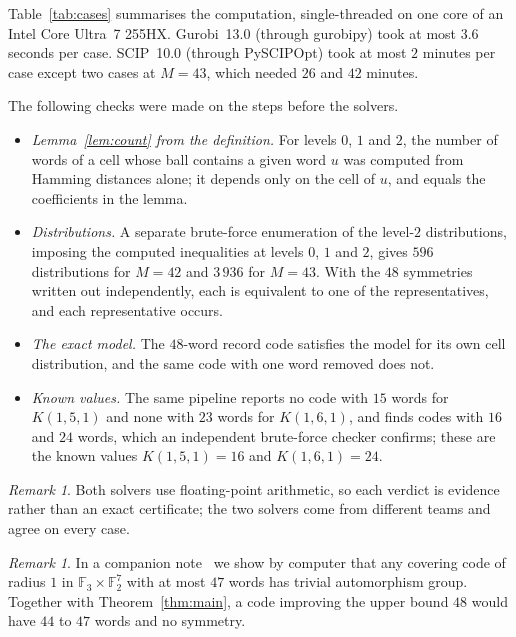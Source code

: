\documentclass[11pt]{article}
\theoremstyle{remark}
\newtheorem{remark}[theorem]{Remark}
\newcommand{\F}{\mathbb{F}}
\begin{document}
Table~\ref{tab:cases} summarises the computation, single-threaded on one core of an Intel Core
Ultra~7 255HX. Gurobi~13.0 (through gurobipy) took at most $3.6$ seconds per case. SCIP~10.0
(through PySCIPOpt) took at most $2$ minutes per case except two cases at $M=43$, which needed
$26$ and $42$ minutes.

The following checks were made on the steps before the solvers.
\begin{itemize}
\item \emph{Lemma~\ref{lem:count} from the definition.} For levels $0$, $1$ and $2$, the number
  of words of a cell whose ball contains a given word $u$ was computed from Hamming distances
  alone; it depends only on the cell of $u$, and equals the coefficients in the lemma.
\item \emph{Distributions.} A separate brute-force enumeration of the level-$2$ distributions,
  imposing the computed inequalities at levels $0$, $1$ and $2$, gives $596$ distributions for
  $M=42$ and $3\,936$ for $M=43$. With the $48$ symmetries written out independently, each is
  equivalent to one of the representatives, and each representative occurs.
\item \emph{The exact model.} The $48$-word record code satisfies the model for its own cell
  distribution, and the same code with one word removed does not.
\item \emph{Known values.} The same pipeline reports no code with $15$ words for $K(1,5,1)$ and
  none with $23$ words for $K(1,6,1)$, and finds codes with $16$ and $24$ words, which an
  independent brute-force checker confirms; these are the known values $K(1,5,1)=16$ and
  $K(1,6,1)=24$.
\end{itemize}

\begin{remark}
Both solvers use floating-point arithmetic, so each verdict is evidence rather than an exact
certificate; the two solvers come from different teams and agree on every case.
\end{remark}

\begin{remark}
In a companion note~\cite{companion} we show by computer that any covering code of radius $1$ in
$\F_3\times\F_2^7$ with at most $47$ words has trivial automorphism group. Together with
Theorem~\ref{thm:main}, a code improving the upper bound $48$ would have $44$ to $47$ words and no
symmetry.
\end{remark}
\end{document}
